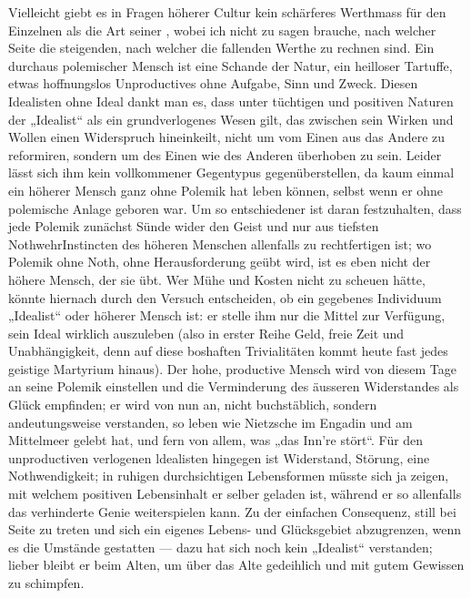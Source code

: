 Vielleicht giebt es in Fragen höherer Cultur kein schärferes Werthmass für den Einzelnen als die Art seiner , wobei ich nicht zu sagen brauche, nach welcher Seite die steigenden, nach welcher die fallenden Werthe zu rechnen sind. Ein durchaus polemischer Mensch ist eine Schande der Natur, ein heilloser Tartuffe, etwas hoffnungslos Unproductives ohne Aufgabe, Sinn und Zweck. Diesen Idealisten ohne Ideal dankt man es, dass unter tüchtigen und positiven Naturen der „Idealist“ als ein grundverlogenes Wesen gilt, das zwischen sein Wirken und Wollen einen Widerspruch hineinkeilt, nicht um vom Einen aus das Andere zu reformiren, sondern um des Einen wie des Anderen überhoben zu sein. Leider lässt sich ihm kein vollkommener Gegentypus gegenüberstellen, da kaum einmal ein höherer Mensch ganz ohne Polemik hat leben können, selbst wenn er ohne polemische Anlage geboren war. Um so entschiedener ist daran festzuhalten, dass jede Polemik zunächst Sünde wider den Geist und nur aus tiefsten NothwehrInstincten des höheren Menschen allenfalls zu rechtfertigen ist; wo Polemik ohne Noth, ohne Herausforderung geübt wird, ist es eben nicht der höhere Mensch, der sie übt. Wer Mühe und Kosten nicht zu scheuen hätte, könnte hiernach durch den Versuch entscheiden, ob ein gegebenes Individuum „Idealist“ oder höherer Mensch ist: er stelle ihm nur die Mittel zur Verfügung, sein Ideal wirklich auszuleben (also in erster Reihe Geld, freie Zeit und Unabhängigkeit, denn auf diese boshaften Trivialitäten kommt heute fast jedes geistige Martyrium hinaus). Der hohe, productive Mensch wird von diesem Tage an seine Polemik einstellen und die Verminderung des äusseren Widerstandes als Glück empfinden; er wird von nun an, nicht buchstäblich, sondern andeutungsweise verstanden, so leben wie Nietzsche im Engadin und am Mittelmeer gelebt hat,  und fern von allem, was „das Inn’re stört“. Für den unproductiven verlogenen ldealisten hingegen ist Widerstand, Störung,  eine Nothwendigkeit; in ruhigen durchsichtigen Lebensformen müsste sich ja zeigen, mit welchem positiven Lebensinhalt er selber geladen ist, während er so allenfalls das verhinderte Genie weiterspielen kann. Zu der einfachen Consequenz, still bei Seite zu treten und sich ein eigenes Lebens- und Glücksgebiet abzugrenzen, wenn es die Umstände gestatten — dazu hat sich noch kein „Idealist“ verstanden; lieber bleibt er beim Alten, um über das Alte gedeihlich und mit gutem Gewissen zu schimpfen.
\par

